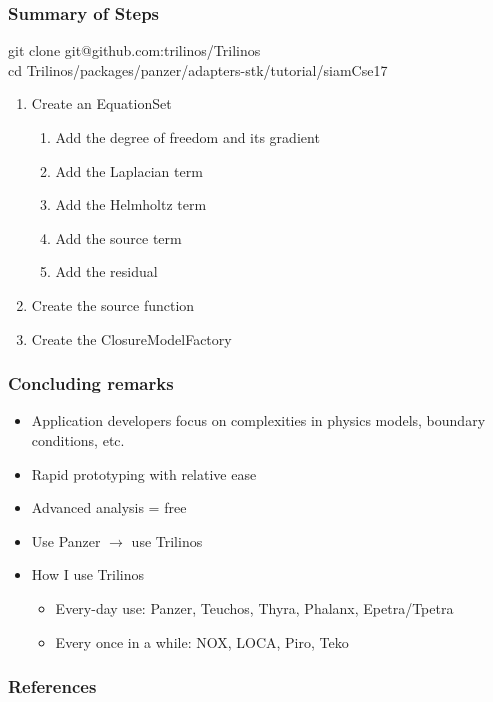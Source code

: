 \documentclass{beamer}
\begin{document}
  \begin{frame}[t]
    \frametitle{Summary of Steps}
    {\fontsize{7}{9}\selectfont
      git clone git@github.com:trilinos/Trilinos \\
      cd Trilinos/packages/panzer/adapters-stk/tutorial/siamCse17
    }
    \vspace{0.8cm}
    \begin{enumerate}
      \item Create an EquationSet
      \begin{enumerate}
        \item Add the degree of freedom and its gradient
        \item Add the Laplacian term
        \item Add the Helmholtz term
        \item Add the source term
        \item Add the residual
      \end{enumerate}
      \item Create the source function
      \item Create the ClosureModelFactory
    \end{enumerate}
  \end{frame}

  \begin{frame}
    \frametitle{Concluding remarks}
    \begin{itemize}
      \item Application developers focus on complexities in physics models, boundary conditions, etc.
      \item Rapid prototyping with relative ease
      \item Advanced analysis = free
      \item Use Panzer $\longrightarrow$ use Trilinos
      \item How I use Trilinos
      \begin{itemize}
        \item Every-day use:  Panzer, Teuchos, Thyra, Phalanx, Epetra/Tpetra
        \item Every once in a while:  NOX, LOCA, Piro, Teko
      \end{itemize}
    \end{itemize}
  \end{frame}

  \begin{frame}
    \frametitle{References}
    \printbibliography
  \end{frame}
\end{document}
